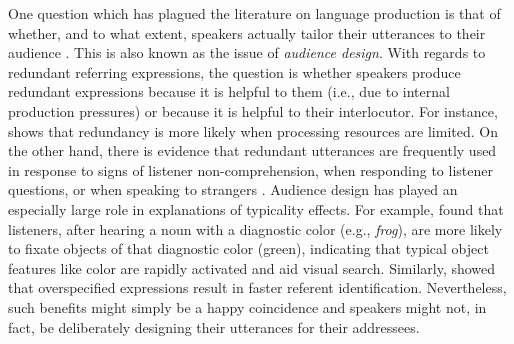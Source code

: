 \documentclass[11pt]{article}
\begin{document}
One question which has plagued the literature on language production is that of whether, and to what extent, speakers actually tailor their utterances to their audience \cite{Clark1982, horton1996, Brown-schmidt2014}. This is also known as the issue of \emph{audience design}. With regards to redundant referring expressions, the question is whether speakers produce redundant expressions because it is helpful to them (i.e., due to internal production pressures) or  because it is helpful to their interlocutor. For instance,  shows that redundancy is more likely when processing resources are limited. On the other hand, there is evidence that redundant  utterances are frequently used in response to signs of
listener non-comprehension, when responding to listener questions, or when speaking to strangers \cite{Baker2008}. 
Audience design has played an especially large role in explanations of typicality effects. For example,  found that listeners, after hearing a noun with a diagnostic color (e.g., \emph{frog}), are more likely to fixate objects of that diagnostic color (green), indicating that typical object features like color are rapidly activated and aid visual search. Similarly,  showed that overspecified expressions result in faster referent identification.  Nevertheless, such benefits might simply be a happy coincidence and speakers might not, in fact, be deliberately designing their utterances for their addressees. 
\end{document}

